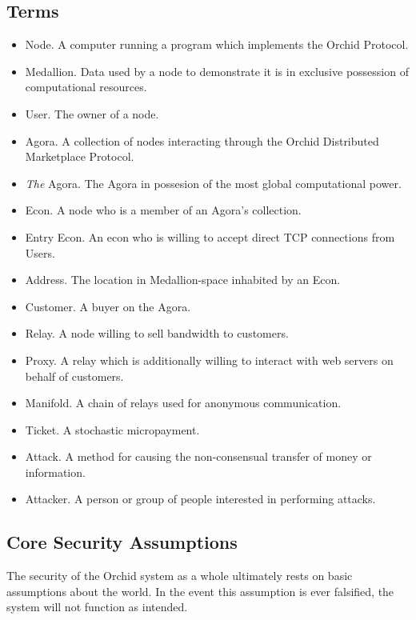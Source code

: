 \documentclass{article}
\newcommand{\mesh}{Orchid}
\begin{document}
\subsection{Terms}

\begin{itemize}
    \item Node. A computer running a program which implements the \mesh{} Protocol.
    \item Medallion. Data used by a node to demonstrate it is in exclusive possession of computational resources.
    \item User. The owner of a node.
    \item Agora. A collection of nodes interacting through the \mesh{} Distributed Marketplace Protocol.
    \item \emph{The} Agora. The Agora in possesion of the most global computational power.
    \item Econ. A node who is a member of an Agora's collection.
    \item Entry Econ. An econ who is willing to accept direct TCP connections from Users.
    \item Address. The location in Medallion-space inhabited by an Econ.
    \item Customer. A buyer on the Agora.
    \item Relay. A node willing to sell bandwidth to customers.
    \item Proxy. A relay which is additionally willing to interact with web servers on behalf of customers.
    \item Manifold. A chain of relays used for anonymous communication.
    \item Ticket. A stochastic micropayment.
    \item Attack. A method for causing the non-consensual transfer of money or information.
    \item Attacker. A person or group of people interested in performing attacks.
\end{itemize}

\subsection{Core Security Assumptions}
\label{core-security}

The security of the \mesh{} system as a whole ultimately rests on basic assumptions about the world. In the event this assumption is ever falsified, the system will not function as intended.
\end{document}
